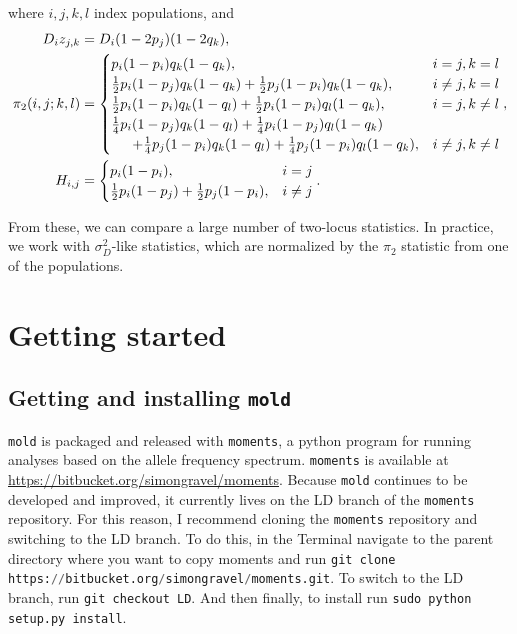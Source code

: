 \documentclass[11pt]{article}
\makeatletter
\newcommand{\mold}{\texttt{mold}\xspace}
\newcommand{\py}[1]{\lstinline[breaklines=true,language=Python, showstringspaces=False]@#1@}
\makeatother
\begin{document}
where $i,j,k,l$ index populations, and
\begin{align*}
 D_iz_{j,k} & = D_i (1-2p_j)(1-2q_k), \\
 {\pi_2}(i,j;k,l) & = \begin{cases}
 				p_i(1-p_i)q_k(1-q_k), & i=j, k=l \\
				\frac{1}{2} p_i(1-p_j) q_k(1-q_k) + \frac{1}{2} p_j(1-p_i) q_k(1-q_k), & i\not= j, k=l \\
				\frac{1}{2} p_i(1-p_i) q_k(1-q_l) + \frac{1}{2} p_i(1-p_i) q_l(1-q_k), & i=j, k\not=l \\
				\frac{1}{4} p_i(1-p_j) q_k(1-q_l) + \frac{1}{4} p_i(1-p_j) q_l(1-q_k) & \\
					\hspace{15 pt} + \frac{1}{4} p_j(1-p_i) q_k(1-q_l) + \frac{1}{4} p_j(1-p_i) q_l(1-q_k) , & i\not=j, k\not=l
 			\end{cases}, \\
 H_{i,j} & = \begin{cases} 
 			p_i(1-p_i), & i = j \\ 
			\frac{1}{2}p_i(1-p_j) + \frac{1}{2}p_j(1-p_i),& i \not= j 
		\end{cases}.
\end{align*}

From these, we can compare a large number of two-locus statistics.
In practice, we work with $\sigma_D^2$-like statistics, which are normalized by the $\pi_2$ statistic from one of the populations.


\section{Getting started}

\subsection{Getting and installing \mold}

\mold is packaged and released with \py{moments}, a python program for running analyses based on the allele frequency spectrum.
\py{moments} is available at \url{https://bitbucket.org/simongravel/moments}.
Because \mold continues to be developed and improved, it currently lives on the LD branch of the \py{moments} repository.
For this reason, I recommend cloning the \py{moments} repository and switching to the LD branch.
To do this, in the Terminal navigate to the parent directory where you want to copy moments and run
\py{git clone https://bitbucket.org/simongravel/moments.git}.
To switch to the LD branch, run
\py{git checkout LD}.
And then finally, to install run
\py{sudo python setup.py install}.
\end{document}
